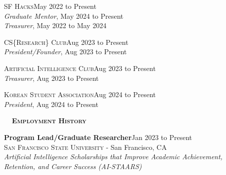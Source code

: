 \documentclass[hidelinks, 10pt]{article}
\def\contentblockspacing{2.5mm}     %
\def\sectionspacing{5mm}            %
\def\sectiontocontentspacing{4mm}   %
\renewcommand{\section}[1]{
    {\fontsize{14}{14}\selectfont \textsc{\textbf{\ \ #1\ \ }}}\hrulefill
}
\begin{document}
\vspace{\contentblockspacing}

\begin{minipage}[ct]{0.9\linewidth}
    \textsc{SF Hacks}\hfill May 2022 to Present\\
    \emph{Graduate Mentor}, May 2024 to Present\\
    \emph{Treasurer}, May 2022 to May 2024
\end{minipage}

\vspace{\contentblockspacing}

\begin{minipage}[ct]{0.9\linewidth}
    \textsc{CS}\{\textsc{Research}\}\textsc{ Club}\hfill Aug 2023 to Present\\
    \emph{President/Founder}, Aug 2023 to Present
\end{minipage}

\vspace{\contentblockspacing}

\begin{minipage}[ct]{0.9\linewidth}
    \textsc{Artificial Intelligence Club}\hfill Aug 2023 to Present\\
    \emph{Treasurer}, Aug 2023 to Present
\end{minipage}

\vspace{\contentblockspacing}

\begin{minipage}[ct]{0.9\linewidth}
    \textsc{Korean Student Association}\hfill Aug 2024 to Present\\
    \emph{President}, Aug 2024 to Present
\end{minipage}

\vspace{\sectionspacing}

\section{Employment History}

\vspace{\sectiontocontentspacing}

\begin{minipage}[ct]{0.9\linewidth}
    \textbf{Program Lead/Graduate Researcher}\hfill Jan 2023 to Present\\
    {\textsc{San Francisco State University} - San Francisco, CA}\\
    \textit{Artificial Intelligence Scholarships that Improve Academic Achievement, Retention, and Career Success (AI-STAARS)}
\end{minipage}
\end{document}
